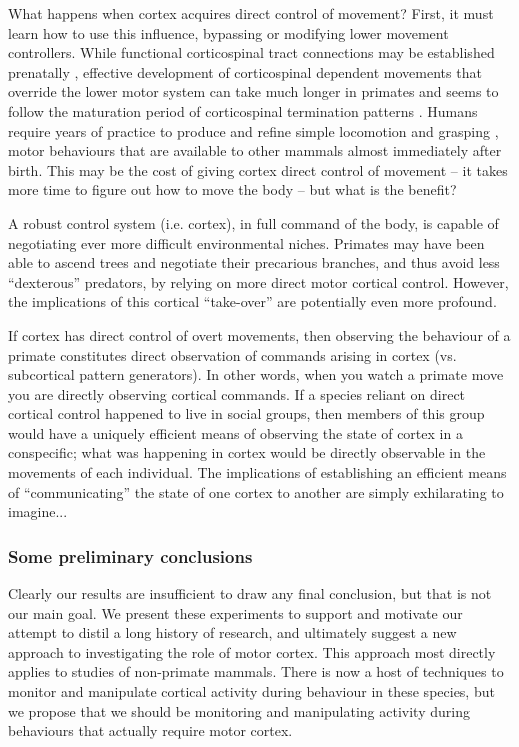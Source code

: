 What happens when cortex acquires direct control of movement? First, it must learn how to use this influence, bypassing or modifying lower movement controllers. While functional corticospinal tract connections may be established prenatally \cite{Eyre2000}, effective development of corticospinal dependent movements that override the lower motor system can take much longer in primates and seems to follow the maturation period of corticospinal termination patterns \cite{Lawrence1976}. Humans require years of practice to produce and refine simple locomotion and grasping \cite{Thelen1985,VonHofsten1989}, motor behaviours that are available to other mammals almost immediately after birth. This may be the cost of giving cortex direct control of movement -- it takes more time to figure out how to move the body -- but what is the benefit? 

A robust control system (i.e. cortex), in full command of the body, is capable of negotiating ever more difficult environmental niches. Primates may have been able to ascend trees and negotiate their precarious branches, and thus avoid less ``dexterous'' predators, by relying on more direct motor cortical control. However, the implications of this cortical ``take-over'' are potentially even more profound. 

If cortex has direct control of overt movements, then observing the behaviour of a primate constitutes direct observation of commands arising in cortex (vs. subcortical pattern generators). In other words, when you watch a primate move you are directly observing cortical commands. If a species reliant on direct cortical control happened to live in social groups, then members of this group would have a uniquely efficient means of observing the state of cortex in a conspecific; what was happening in cortex would be directly observable in the movements of each individual. The implications of establishing an efficient means of ``communicating'' the state of one cortex to another are simply exhilarating to imagine...

\subsubsection*{Some preliminary conclusions}

Clearly our results are insufficient to draw any final conclusion, but that is not our main goal. We present these experiments to support and motivate our attempt to distil a long history of research, and ultimately suggest a new approach to investigating the role of motor cortex. This approach most directly applies to studies of non-primate mammals. There is now a host of techniques to monitor and manipulate cortical activity during behaviour in these species, but we propose that we should be monitoring and manipulating activity during behaviours that actually require motor cortex.

